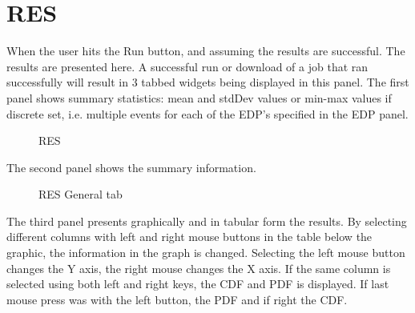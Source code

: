 \section{RES}

When the user hits the Run button, and assuming the results are successful. The results are presented here.  A successful run or download of a job that ran successfully will result in 3 tabbed widgets being displayed in this panel.  The first panel shows summary statistics: mean and stdDev values or min-max values if discrete set, i.e. multiple events for each of the EDP's specified in the EDP panel.

\begin{figure}[!htbp]
  \caption{RES}
  \label{fig:figure12}
\end{figure}

The second panel shows the summary information.

\begin{figure}[!htbp]
  \caption{RES General tab}
  \label{fig:figure13}
\end{figure}

The third panel presents graphically and in tabular form the results. By selecting different columns with left and right mouse buttons in the table below the graphic, 
the information in the graph is changed. Selecting the left mouse button changes the Y axis, the right mouse changes the X axis. If the same column is selected 
using both left and right keys, the CDF and PDF is displayed. If last mouse press was with the left button, the PDF and if right the CDF.

